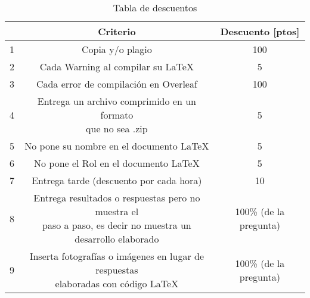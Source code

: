 \begin{table}[H]
    \centering
    \begin{tabular}{|c|c|c|}
    \hline
        & \textbf{Criterio} & \textbf{Descuento} [ptos] \\
    \hline
        1 & Copia y/o plagio & 100 \\
    \hline
        2 & Cada Warning al compilar su \LaTeX & 5\\
    \hline
        3 & Cada error de compilación en Overleaf & 100 \\
    \hline
        4 & \makecell{Entrega un archivo comprimido en un formato\\ que no sea .zip} & 5 \\
    \hline
        5 & No pone su nombre en el documento \LaTeX & 5\\
    \hline
        6 & No pone el Rol en el documento \LaTeX & 5\\
    \hline
        7 & Entrega tarde (descuento por cada hora) & 10\\
    \hline
        8 & \makecell{Entrega resultados o respuestas pero no muestra el\\ paso a paso, es decir no muestra un desarrollo elaborado} &  100\% (de la pregunta) \\
    \hline
        9 & \makecell{Inserta fotografías o imágenes en lugar de respuestas\\ elaboradas con código \LaTeX} & 100\% (de la pregunta)\\
    \hline
    \end{tabular}
    \caption{Tabla de descuentos}
    \label{tab:desc}
\end{table}